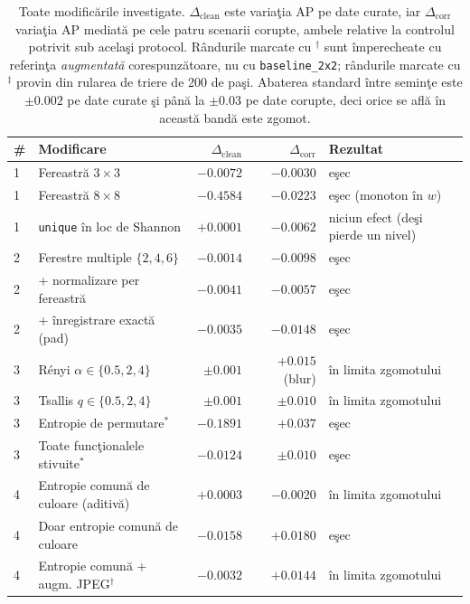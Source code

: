 \begin{table}[t]
  \centering
  \caption{Toate modificările investigate. $\Delta_{\text{clean}}$ este
  variaţia AP pe date curate, iar $\Delta_{\text{corr}}$ variaţia AP mediată pe
  cele patru scenarii corupte, ambele relative la controlul potrivit sub acelaşi
  protocol. Rândurile marcate cu $^\dagger$ sunt împerecheate cu referinţa
  \emph{augmentată} corespunzătoare, nu cu \texttt{baseline\_2x2}; rândurile
  marcate cu $^\ddagger$ provin din rularea de triere de 200 de paşi. Abaterea
  standard între seminţe este $\pm0.002$ pe date curate şi până la $\pm0.03$ pe
  date corupte, deci orice se află în această bandă este zgomot.}
  \label{tab:summary}
  \small
  \begin{tabular}{llrrl}
    \toprule
    \# & Modificare & $\Delta_{\text{clean}}$ & $\Delta_{\text{corr}}$ & Rezultat \\
    \midrule
    1 & Fereastră $3\times3$                     & $-0.0072$ & $-0.0030$ & eşec \\
    1 & Fereastră $8\times8$                     & $-0.4584$ & $-0.0223$ & eşec (monoton în $w$) \\
    1 & \texttt{unique} în loc de Shannon        & $+0.0001$ & $-0.0062$ & niciun efect (deşi pierde un nivel) \\
    \midrule
    2 & Ferestre multiple $\{2,4,6\}$            & $-0.0014$ & $-0.0098$ & eşec \\
    2 & \quad + normalizare per fereastră        & $-0.0041$ & $-0.0057$ & eşec \\
    2 & \quad + înregistrare exactă (pad)        & $-0.0035$ & $-0.0148$ & eşec \\
    \midrule
    3 & Rényi $\alpha \in \{0.5,2,4\}$           & $\pm0.001$ & $+0.015$ (blur) & în limita zgomotului \\
    3 & Tsallis $q \in \{0.5,2,4\}$              & $\pm0.001$ & $\pm0.010$ & în limita zgomotului \\
    3 & Entropie de permutare$^{*}$              & $-0.1891$ & $+0.037$ & eşec \\
    3 & Toate funcţionalele stivuite$^{*}$       & $-0.0124$ & $\pm0.010$ & eşec \\
    \midrule
    4 & Entropie comună de culoare (aditivă)     & $+0.0003$ & $-0.0020$ & în limita zgomotului \\
    4 & Doar entropie comună de culoare          & $-0.0158$ & $+0.0180$ & eşec \\
    4 & Entropie comună + augm. JPEG$^\dagger$   & $-0.0032$ & $+0.0144$ & în limita zgomotului \\

\end{tabular}
\end{table}
